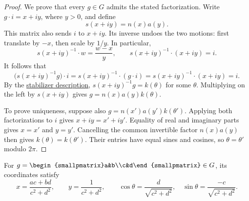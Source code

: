 \begin{proof}
We prove that every $g\in G$ admits the stated factorization. Write $g\cdot i=x+iy$, where $y>0$, and define
\[
 s(x+iy)=n(x)a(y).
\]
This matrix also sends $i$ to $x+iy$. Its inverse undoes the two motions: first translate by $-x$, then scale by $1/y$. In particular,
\begin{equation}\label{eq:iwasawa-inverse-action}
 s(x+iy)^{-1}\cdot w=\frac{w-x}{y},\qquad
 s(x+iy)^{-1}\cdot(x+iy)=i.
\end{equation}
It follows that
\[
 \bigl(s(x+iy)^{-1}g\bigr)\cdot i
 =s(x+iy)^{-1}\cdot(g\cdot i)
 =s(x+iy)^{-1}\cdot(x+iy)=i.
\]
By the \hyperref[hyperbolic.stabilizer]{stabilizer description}, $s(x+iy)^{-1}g=k(\theta)$ for some $\theta$. Multiplying on the left by $s(x+iy)$ gives $g=n(x)a(y)k(\theta)$.

To prove uniqueness, suppose also $g=n(x')a(y')k(\theta')$. Applying both factorizations to $i$ gives $x+iy=x'+iy'$. Equality of real and imaginary parts gives $x=x'$ and $y=y'$. Cancelling the common invertible factor $n(x)a(y)$ then gives $k(\theta)=k(\theta')$. Their entries have equal sines and cosines, so $\theta=\theta'$ modulo $2\pi$.
\end{proof}

\begin{proposition}\label{hyperbolic.iwasawa-explicit-coordinates}
For $g=\begin{smallpmatrix}a&b\\c&d\end{smallpmatrix}\in G$, its coordinates satisfy
\[
 x=\frac{ac+bd}{c^2+d^2},\qquad y=\frac1{c^2+d^2},\qquad
 \cos\theta=\frac d{\sqrt{c^2+d^2}},\quad \sin\theta=\frac{-c}{\sqrt{c^2+d^2}}.
\]
\end{proposition}

